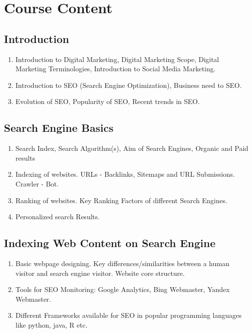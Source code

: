 \section{Course Content}

\subsection{Introduction}

\begin{enumerate}
    \item Introduction to Digital Marketing, Digital Marketing Scope, Digital Marketing Terminologies, Introduction to Social Media Marketing.
    \item Introduction to SEO (Search Engine Optimization), Business need to SEO.
    \item Evolution of SEO, Popularity of SEO, Recent trends in SEO.
\end{enumerate}

\subsection{Search Engine Basics}

\begin{enumerate}
    \item Search Index, Search Algorithm(s), Aim of Search Engines, Organic and Paid results
    \item Indexing of websites. URLs - Backlinks, Sitemaps and URL Submissions. Crawler - Bot. 
    \item Ranking of websites. Key Ranking Factors of different Search Engines.
    \item Personalized search Results.
    
\end{enumerate}

\subsection{Indexing Web Content on Search Engine}

\begin{enumerate}
    \item Basic webpage designing. Key differences/similarities between a human visitor and search engine visitor. Website core structure.
    \item Tools for SEO Monitoring: Google Analytics, Bing Webmaster, Yandex Webmaster. 
    \item Different Frameworks available for SEO in popular programming languages like python, java, R etc.
    
\end{enumerate}

